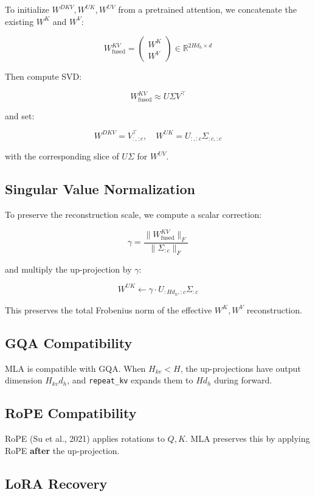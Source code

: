 To initialize $W^{DKV}, W^{UK}, W^{UV}$ from a pretrained attention, we 
concatenate the existing $W^K$ and $W^V$:

\[
W^{KV}_\text{fused} = \begin{pmatrix} W^K \\ W^V \end{pmatrix} \in \mathbb{R}^{2 H d_h \times d}
\tag{3.6}
\]

Then compute SVD:

\[
W^{KV}_\text{fused} \approx U \Sigma V^\top
\tag{3.7}
\]

and set:

\[
W^{DKV} = V_{:, :c}^\top, \quad
W^{UK} = U_{:, :c} \Sigma_{:c, :c}
\tag{3.8}
\]

with the corresponding slice of $U \Sigma$ for $W^{UV}$.

\subsection{Singular Value Normalization}

To preserve the reconstruction scale, we compute a scalar correction:

\[
\gamma = \frac{\|W^{KV}_\text{fused}\|_F}{\|\Sigma_{:c}\|_F}
\tag{3.9}
\]

and multiply the up-projection by $\gamma$:

\[
W^{UK} \leftarrow \gamma \cdot U_{:H d_h, :c} \Sigma_{:c}
\tag{3.10}
\]

This preserves the total Frobenius norm of the effective $W^K, W^V$ 
reconstruction.

\subsection{GQA Compatibility}

MLA is compatible with GQA. When $H_{kv} < H$, the up-projections have 
output dimension $H_{kv} d_h$, and \texttt{repeat\_kv} expands them to $H d_h$ 
during forward.

\subsection{RoPE Compatibility}

RoPE (Su et al., 2021) applies rotations to $Q, K$. MLA preserves this by 
applying RoPE \textbf{after} the up-projection.

\subsection{LoRA Recovery}

